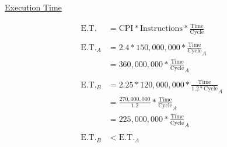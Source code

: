 \documentclass[11pt]{article}
\begin{document}
  \begin{center}\underline{Execution Time}\end{center}\vspace{-.5cm}
  \begin{align*}
    \text{E.T.} &= \text{CPI} * \text{Instructions} * \frac{\text{Time}}{\text{Cycle}}\\\\
    \text{E.T.}_{A} &= 2.4 * 150,000,000 * \frac{\text{Time}}{\text{Cycle}}_{A}\\
                    &= 360,000,000 * \frac{\text{Time}}{\text{Cycle}}_{A}\\\\
    \text{E.T.}_{B} &= 2.25 * 120,000,000 * \frac{\text{Time}}{1.2 * \text{Cycle}}_{A}\\
                    &= \frac{270,000,000}{1.2} * \frac{\text{Time}}{\text{Cycle}}_{A}\\
                    &= 225,000,000 * \frac{\text{Time}}{\text{Cycle}}_{A}\\\\
    \text{E.T.}_{B} &< \text{E.T.}_{A}
  \end{align*}
\end{document}
